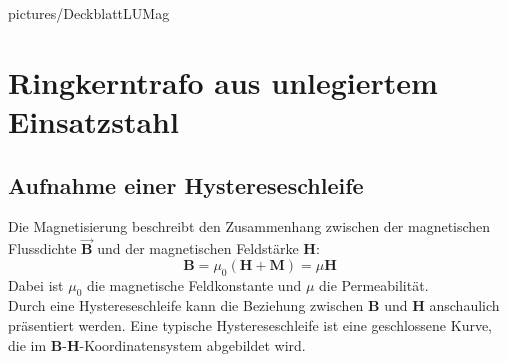 \documentclass[a4paper,twoside,12pt,DIV=13,BCOR=5mm,numbers=noenddot,cleardoublepage=empty]{scrbook}
\begin{document}
\renewcommand{\baselinestretch}{1.25}
\newcommand{\StudentA}{Marton Harsch}
\newcommand{\MatrNrA}{12123680}
\newcommand{\StudentB}{Michael Malburg}
\newcommand{\MatrNrB}{61806515}
\newcommand{\StudentC}{Jonathan Gamperl}
\newcommand{\MatrNrC}{12302766}

\newcommand{\LUDatum}{22.4.2024}
\newcommand{\LUGruppe}{}
\newcommand{\LUBetreuer}{}

\large

{pictures/DeckblattLUMag}     %

\setcounter{chapter}{0}


\chapter{Ringkerntrafo aus unlegiertem Einsatzstahl}
\section{Aufnahme einer Hystereseschleife}

    Die Magnetisierung beschreibt den Zusammenhang zwischen der magnetischen Flussdichte $\Vec{\textbf{B}}$ und der magnetischen Feldstärke $\textbf{H}$:
    \begin{equation}
        \textbf{B} = \mu_0 (\textbf{H} + \textbf{M}) = \mu\textbf{H}
    \end{equation} 
    Dabei ist $\mu_0$ die magnetische Feldkonstante und $\mu$ die Permeabilität. \\
    Durch eine Hystereseschleife kann die Beziehung zwischen $\textbf{B}$ und $\textbf{H}$ anschaulich präsentiert werden. Eine typische Hystereseschleife ist eine geschlossene Kurve, die im \textbf{B}-\textbf{H}-Koordinatensystem abgebildet wird. \\
    
\end{document}
